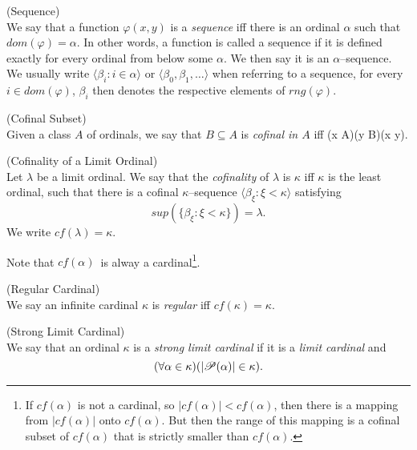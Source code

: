 \begin{definition}{(Sequence)}\label{def:sequence}\\
We say that a function $\varphi(x, y)$ is a \emph{sequence} iff there is an ordinal $\alpha$ such that $dom(\varphi) = \alpha$. In other words, a function is called a sequence if it is defined exactly for every ordinal from below some $\alpha$. We then say it is an $\alpha$–sequence. We usually write $\langle \beta_i : i \in \alpha \rangle$ or $\langle \beta_0, \beta_1, \ldots \rangle$ when referring to a sequence, for every $i \in dom(\varphi)$, $\beta_i$ then denotes the respective elements of $rng(\varphi)$.
\end{definition}

\begin{definition}{(Cofinal Subset)}\label{def:cofinal_subset}\\
Given a class $A$ of ordinals, we say that $B \subseteq A$ is \emph{cofinal in $A$} iff
\beq
(\forall x \in A)(\exists y \in B)(x \in y)\mbox{.}
\eeq
\end{definition}

\begin{definition}{(Cofinality of a Limit Ordinal)}\label{def:cofinality}\\ %
Let $\lambda$ be a limit ordinal. 
We say that the \emph{cofinality} of $\lambda$ is $\kappa$ iff $\kappa$ is the least ordinal, such that there is a cofinal $\kappa$–sequence $\langle \beta_\xi : \xi < \kappa \rangle$ satisfying
\begin{equation}
sup(\{\beta_\xi: \xi < \kappa\}) = \lambda\mbox{.}
\end{equation}
We write $cf(\lambda) = \kappa$.
\end{definition}
Note that $cf(\alpha)$ is alway a cardinal\footnote{If $cf(\alpha)$ is not a cardinal, so $|cf(\alpha)| < cf(\alpha)$, then there is a mapping from $|cf(\alpha)|$ onto $cf(\alpha)$. But then the range of this mapping is a cofinal subset of $cf(\alpha)$ that is strictly smaller than $cf(\alpha)$.}.

\begin{definition}{(Regular Cardinal)}\label{def:regular_cardinal}\\
We say an infinite cardinal $\kappa$ is \emph{regular} iff $cf(\kappa) = \kappa$. %
\end{definition}

\begin{definition}{(Strong Limit Cardinal)}\label{def:strong_limit_cardinal}\\
We say that an ordinal $\kappa$ is a \emph{strong limit cardinal} if it is a \emph{limit cardinal} and 
\begin{equation}
(\forall \alpha \in \kappa)(|\mathscr{P} (\alpha)| \in \kappa)\mbox{.}
\end{equation}
\end{definition}

